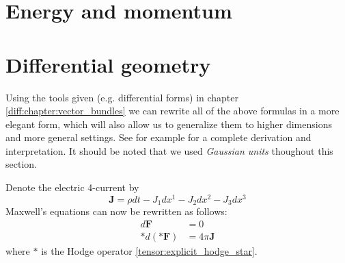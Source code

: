 \section{Energy and momentum}

    
    
\section{Differential geometry}

	Using the tools given (e.g. differential forms) in chapter \ref{diff:chapter:vector_bundles} we can rewrite all of the above formulas in a more elegant form, which will also allow us to generalize them to higher dimensions and more general settings. See for example \cite{principal_bundles} for a complete derivation and interpretation. It should be noted that we used \textit{Gaussian units} thoughout this section.
	
	
	\begin{formula}
		Denote the electric 4-current by \[\mathbf{J} = \rho dt - J_1dx^1 - J_2dx^2 - J_3dx^3\] Maxwell's equations can now be rewritten as follows:
		\begin{align}
			d\mathbf{F} &= 0\label{maxwell:diff_homogeneous}\\
			\ast d(\ast \mathbf{F}) &= 4\pi\mathbf{J}
		\end{align}
		where $\ast$ is the Hodge operator \ref{tensor:explicit_hodge_star}.
	\end{formula}
	
